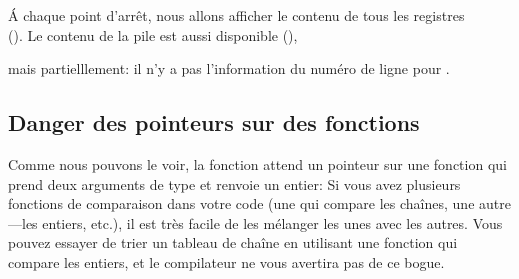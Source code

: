 Á chaque point d'arrêt, nous allons afficher le contenu de tous les registres\\
().
Le contenu de la pile est aussi disponible (),

mais partielllement: il n'y a pas l'information du numéro de ligne pour \comp.



\subsection{Danger des pointeurs sur des fonctions}

Comme nous pouvons le voir, la fonction \qsort attend un pointeur sur une fonction
qui prend deux arguments de type  et renvoie un entier:
Si vous avez plusieurs fonctions de comparaison dans votre code (une qui compare
les chaînes, une autre---les entiers, etc.), il est très facile de les mélanger les
unes avec les autres.
Vous pouvez essayer de trier un tableau de chaîne en utilisant une fonction qui compare
les entiers, et le compilateur ne vous avertira pas de ce bogue.

